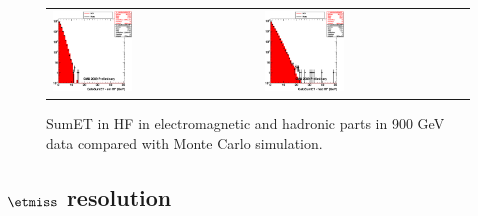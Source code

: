 \begin{figure}[h!]
 \centering
 \begin{tabular}{ll}
  \includegraphics[width=0.40\textwidth]{plots_DataVsMC_MB_900GeV/h_caloSumetEmHF.eps} &
  \includegraphics[width=0.40\textwidth]{plots_DataVsMC_MB_900GeV/h_caloSumetHadHF.eps} \\
 \end{tabular}
 \caption{SumET in HF in electromagnetic and hadronic parts in 900 GeV data compared
   with Monte Carlo simulation.
          \label{fig:DataVsMC_MB_900_6}}
\end{figure}

\clearpage

\subsection{$\etmiss$ resolution}

